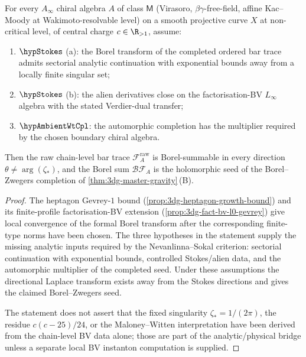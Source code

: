 \begin{theorem}
\label{thm:3dg-class-M-borel-unconditional}%
%
%
For every $A_{\infty}$ chiral algebra $A$ of class $\mathsf M$
(Virasoro, $\beta\gamma$-free-field, affine Kac--Moody at
Wakimoto-resolvable level) on a smooth projective curve $X$ at
non-critical level, of central charge $c\in\R_{>1}$, assume:
\begin{enumerate}[label=\textup{(\alph*)}]
\item $\hypStokes$ (a): the Borel transform of the completed ordered
bar trace admits sectorial analytic continuation with exponential
bounds away from a locally finite singular set;
\item $\hypStokes$ (b): the alien derivatives close on the
factorisation-BV $L_\infty$ algebra with the stated Verdier-dual
transfer;
\item $\hypAmbientWtCpl$: the automorphic completion has the
multiplier required by the chosen boundary chiral algebra.
\end{enumerate}
Then the raw
chain-level bar trace $\mathcal F_{A}^{\mathrm{raw}}$ is
Borel-summable in every direction $\theta\ne\arg(\zeta_{\ast})$,
and the Borel sum $\mathcal B\mathcal F_{A}$ is the
holomorphic seed of the Borel--Zwegers completion of
\autoref{thm:3dg-master-gravity}\,\textup{(B)}.
\end{theorem}

\begin{proof}
The heptagon Gevrey-$1$ bound
(\autoref{prop:3dg-heptagon-growth-bound}) and its finite-profile
factorisation-BV extension
(\autoref{prop:3dg-fact-bv-l0-gevrey}) give local convergence of the
formal Borel transform after the corresponding finite-type norms have
been chosen. The
three hypotheses in the statement supply the missing analytic inputs
required by the Nevanlinna--Sokal criterion: sectorial continuation
with exponential bounds, controlled Stokes/alien data, and the
automorphic multiplier of the completed seed. Under these assumptions
the directional Laplace transform exists away from the Stokes
directions and gives the claimed Borel--Zwegers seed.

The statement does not assert that the fixed singularity
$\zeta_\ast=1/(2\pi)$, the residue $c(c-25)/24$, or the
Maloney--Witten interpretation have been derived from the chain-level
BV data alone; those are part of the analytic/physical bridge unless a
separate local BV instanton computation is supplied.
\end{proof}

